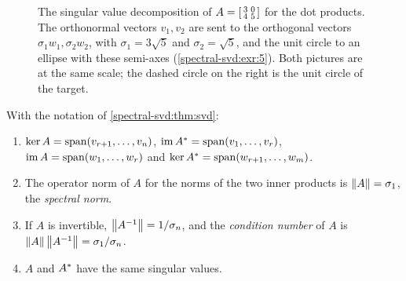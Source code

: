 \begin{notechapter}
\begin{figure}[ht]
\centering
{}
\caption{The singular value decomposition of
$A = \begin{bsmallmatrix}3 & 0\\4 & 5\end{bsmallmatrix}$ for the dot
products. The orthonormal vectors $v_1, v_2$ are sent to the orthogonal
vectors $\sigma_1w_1, \sigma_2w_2$, with $\sigma_1 = 3\sqrt5$ and
$\sigma_2 = \sqrt5$, and the unit circle to an ellipse with these
semi-axes (\cref{spectral-svd:exr:5}). Both pictures are at the same
scale; the dashed circle on the right is the unit circle of the target.}
\label{spectral-svd:fig:svd}
\end{figure}

\begin{corollary}\label{spectral-svd:cor:svd}
With the notation of \cref{spectral-svd:thm:svd}:
\begin{enumerate}[nosep]
  \item $\ker A = \operatorname{span}(v_{r+1},\dots,v_n)$,
        $\operatorname{im}A^{*} = \operatorname{span}(v_1,\dots,v_r)$,
        $\operatorname{im} A = \operatorname{span}(w_1,\dots,w_r)$ and
        $\ker A^{*} = \operatorname{span}(w_{r+1},\dots,w_m)$.
  \item The operator norm of $A$ for the norms of the two inner products
        is $\left\|A\right\| = \sigma_1$, the \emph{spectral norm}.
  \item If $A$ is invertible, $\left\|A^{-1}\right\| = 1/\sigma_n$, and the
        \emph{condition number} of $A$ is
        $\left\|A\right\|\left\|A^{-1}\right\| = \sigma_1/\sigma_n$.
  \item $A$ and $A^{*}$ have the same singular values.
\end{enumerate}
\end{corollary}


\end{notechapter}
